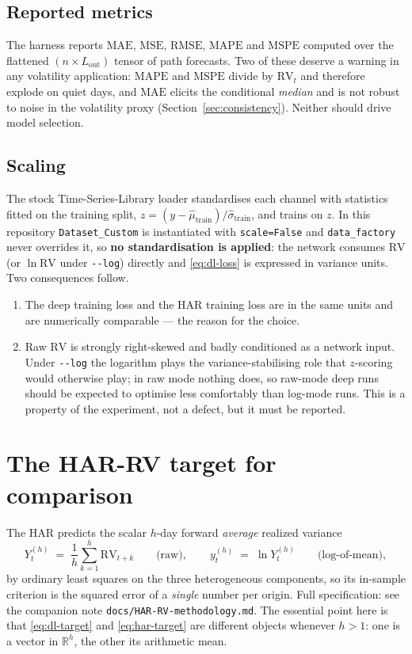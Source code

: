 \documentclass[11pt,a4paper]{article}
\newcommand{\RV}{\mathrm{RV}}
\newcommand{\MSE}{\mathrm{MSE}}
\newcommand{\MAE}{\mathrm{MAE}}
\newcommand{\Lout}{L_{\mathrm{out}}}
\begin{document}
\subsection{Reported metrics}

The harness reports $\MAE$, $\MSE$, $\mathrm{RMSE}$, $\mathrm{MAPE}$ and $\mathrm{MSPE}$
computed over the flattened $(n\times\Lout)$ tensor of path forecasts. Two of these deserve
a warning in any volatility application: $\mathrm{MAPE}$ and $\mathrm{MSPE}$ divide by
$\RV_t$ and therefore explode on quiet days, and $\MAE$ elicits the conditional
\emph{median} and is not robust to noise in the volatility proxy
(Section~\ref{sec:consistency}). Neither should drive model selection.

\subsection{Scaling}

The stock Time-Series-Library loader standardises each channel with statistics fitted on
the training split, $z=(y-\hat\mu_{\text{train}})/\hat\sigma_{\text{train}}$, and trains on
$z$. In this repository \texttt{Dataset\_Custom} is instantiated with \texttt{scale=False}
and \texttt{data\_factory} never overrides it, so \textbf{no standardisation is applied}:
the network consumes $\RV$ (or $\ln \RV$ under \texttt{-{}-log}) directly and
\eqref{eq:dl-loss} is expressed in variance units. Two consequences follow.
\begin{enumerate}
  \item The deep training loss and the HAR training loss are in the same units and are
        numerically comparable --- the reason for the choice.
  \item Raw $\RV$ is strongly right-skewed and badly conditioned as a network input. Under
        \texttt{-{}-log} the logarithm plays the variance-stabilising role that $z$-scoring
        would otherwise play; in raw mode nothing does, so raw-mode deep runs should be
        expected to optimise less comfortably than log-mode runs. This is a property of the
        experiment, not a defect, but it must be reported.
\end{enumerate}

\section{The HAR-RV target for comparison}
\label{sec:har}

The HAR predicts the scalar $h$-day forward \emph{average} realized variance
\begin{equation}
  Y^{(h)}_{t} \;=\; \frac{1}{h}\sum_{k=1}^{h}\RV_{t+k}
  \qquad\text{(raw)},
  \qquad
  y^{(h)}_{t} \;=\; \ln Y^{(h)}_{t}
  \qquad\text{(log-of-mean)},
  \label{eq:har-target}
\end{equation}
by ordinary least squares on the three heterogeneous components, so its in-sample criterion
is the squared error of a \emph{single} number per origin. Full specification: see the
companion note \texttt{docs/HAR-RV-methodology.md}. The essential point here is that
\eqref{eq:dl-target} and \eqref{eq:har-target} are different objects whenever $h>1$:
one is a vector in $\mathbb{R}^{h}$, the other its arithmetic mean.
\end{document}
